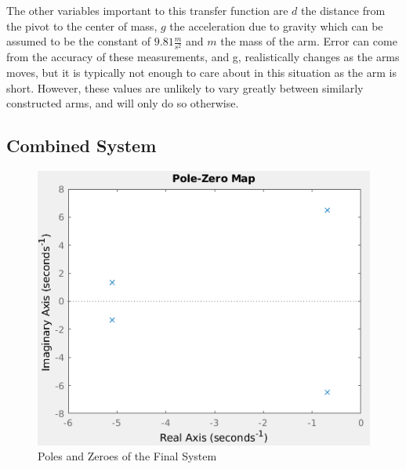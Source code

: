 \documentclass[a4paper, 11pt, compsoc]{IEEEtran}
\begin{document}
            \par
            The other variables important to this transfer function are $d$ the distance from the pivot to the center of mass, $g$ the acceleration due to gravity which can be assumed to be the constant of $9.81 \frac{m}{s^2}$ and $m$ the mass of the arm. Error can come from the accuracy of these measurements, and g, realistically changes as the arms moves, but it is typically not enough to care about in this situation as the arm is short. However, these values are unlikely to vary greatly between similarly constructed arms, and will only do so otherwise.
        \subsection{Combined System}\label{sec:combined}
            \begin{figure}
                \centering
                \includegraphics[width=\columnwidth]{fullSystemPZ.png}
                \caption{Poles and Zeroes of the Final System}
                \label{fig:fullPZ}
            \end{figure}
\end{document}
